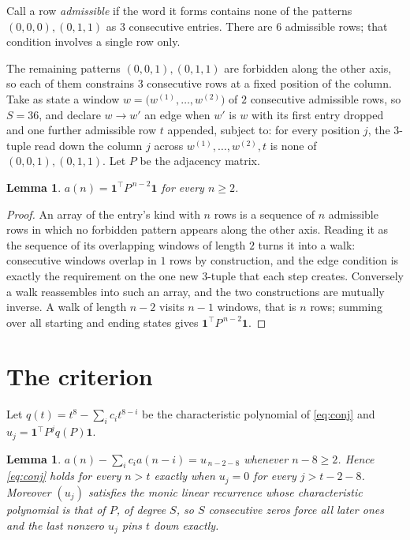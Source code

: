 \documentclass[11pt,a4paper]{article}
\theoremstyle{plain}
\newtheorem{lemma}[theorem]{Lemma}
\theoremstyle{definition}
\begin{document}
Call a row \emph{admissible} if the word it forms contains none of the patterns
$(0,0,0), (0,1,1)$ as $3$ consecutive entries. There are $6$ admissible rows; that condition
involves a single row only.

The remaining patterns $(0,0,1), (0,1,1)$ are forbidden along the other axis, so each of them
constrains $3$ consecutive rows at a fixed position of the column. Take as state a
window $w=\bigl(w^{(1)},\dots,w^{(2)}\bigr)$ of $2$ consecutive admissible
rows, so $S=36$, and declare $w\to w'$ an edge when $w'$ is $w$ with its first entry
dropped and one further admissible row $t$ appended, subject to: for every position
$j$, the $3$-tuple read down the column $j$ across $w^{(1)},\dots,w^{(2)},t$
is none of $(0,0,1), (0,1,1)$. Let $P$ be the adjacency matrix.

\begin{lemma}\label{lem:walk}
$a(n)=\mathbf{1}^{\!\top}P^{\,n-2}\mathbf{1}$ for every $n\ge2$.
\end{lemma}

\begin{proof}
An array of the entry's kind with $n$ rows is a sequence of $n$ admissible rows in
which no forbidden pattern appears along the other axis. Reading it as the sequence of its
overlapping windows of length $2$ turns it into a walk: consecutive windows overlap in
$1$ rows by construction, and the edge condition is exactly the requirement on the one
new $3$-tuple that each step creates. Conversely a walk reassembles into such an array,
and the two constructions are mutually inverse. A walk of length $n-2$ visits $n-1$
windows, that is $n$ rows; summing over all starting and ending states gives
$\mathbf{1}^{\!\top}P^{\,n-2}\mathbf{1}$.
\end{proof}

\section{The criterion}

Let $q(t)=t^{8}-\sum_i c_i t^{8-i}$ be the characteristic polynomial of
\eqref{eq:conj} and $u_j=\mathbf{1}^{\!\top}P^{j}q(P)\mathbf{1}$.

\begin{lemma}\label{lem:crit}
$a(n)-\sum_i c_i a(n-i)=u_{\,n-2-8}$ whenever $n-8\ge2$. Hence
\eqref{eq:conj} holds for every $n>t$ exactly when $u_j=0$ for every
$j>t-2-8$. Moreover $(u_j)$ satisfies the monic linear recurrence whose
characteristic polynomial is that of $P$, of degree $S$, so $S$ consecutive zeros force all
later ones and the last nonzero $u_j$ pins $t$ down exactly.
\end{lemma}
\end{document}
